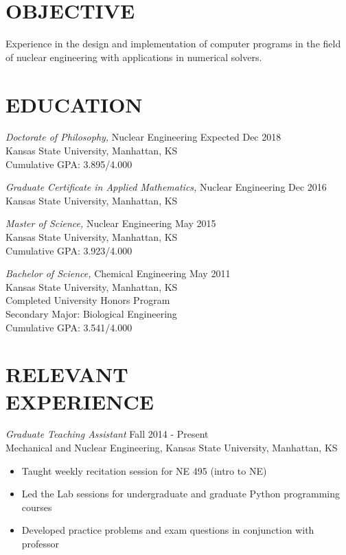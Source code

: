\documentclass[margin, 10pt]{res} %
\begin{document}
\begin{resume}
 
\section{OBJECTIVE}  

Experience in the design and implementation of computer programs in the field 
of nuclear engineering with applications in numerical solvers.

\section{EDUCATION}

{\sl Doctorate of Philosophy,} Nuclear Engineering \hfill Expected Dec 2018\\
Kansas State University, Manhattan, KS \\
Cumulative GPA: 3.895/4.000

{\sl Graduate Certificate in Applied Mathematics,} Nuclear Engineering \hfill Dec 2016\\
Kansas State University, Manhattan, KS

{\sl Master of Science,} Nuclear Engineering \hfill May 2015\\
Kansas State University, Manhattan, KS \\
Cumulative GPA: 3.923/4.000

{\sl Bachelor of Science,} Chemical Engineering \hfill May 2011 \\
Kansas State University, Manhattan, KS \\
Completed University Honors Program \\
Secondary Major: Biological Engineering \\
Cumulative GPA: 3.541/4.000

\section{RELEVANT \\ EXPERIENCE}

{\sl Graduate Teaching Assistant} \hfill Fall 2014 - Present \\
Mechanical and Nuclear Engineering, Kansas State University, Manhattan, KS \\
\begin{itemize} \itemsep -2pt %
\item Taught weekly recitation session for NE 495 (intro to NE)
\item Led the Lab sessions for undergraduate and graduate Python programming courses
\item Developed practice problems and exam questions in conjunction with 
professor
\end{itemize}
 

\end{resume}
\end{document}
